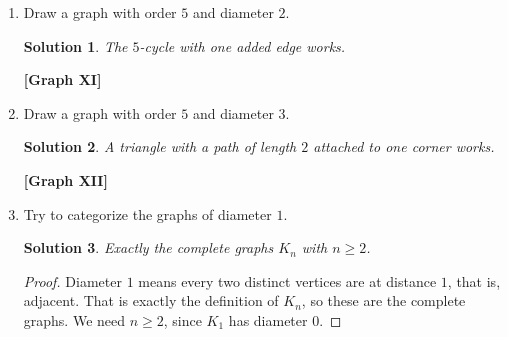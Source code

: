 \documentclass[11pt]{article}
\theoremstyle{solstyle}
\newtheorem*{solution}{Solution}
\newcommand{\glabel}[1]{\begin{center}\textbf{[Graph #1]}\end{center}}
\begin{document}
\begin{enumerate}[leftmargin=*]
\begin{enumerate}[label=(\alph*),leftmargin=*]
\item Draw a graph with order $5$ and diameter $2$.

\begin{solution}
The $5$-cycle with one added edge works.
\end{solution}

\begin{center}
\end{center}
\glabel{XI}

\item Draw a graph with order $5$ and diameter $3$.

\begin{solution}
A triangle with a path of length $2$ attached to one corner works.
\end{solution}

\begin{center}
\end{center}
\glabel{XII}

\item Try to categorize the graphs of diameter $1$.

\begin{solution}
Exactly the complete graphs $K_n$ with $n\ge 2$.
\end{solution}

\begin{proof}
Diameter $1$ means every two distinct vertices are at distance $1$, that is, adjacent. That is exactly the definition of $K_n$, so these are the complete graphs. We need $n\ge 2$, since $K_1$ has diameter $0$.
\end{proof}

\end{enumerate}


\end{enumerate}
\end{document}
